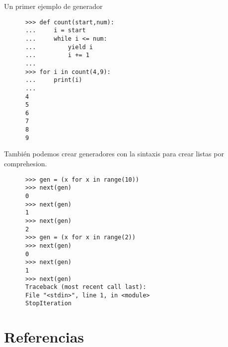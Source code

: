 \documentclass[spanish]{beamer}
\begin{document}
  \begin{frame}[fragile]
    Un primer ejemplo de generador
    \begin{lstlisting}
      >>> def count(start,num):
      ...     i = start
      ...     while i <= num:
      ...         yield i
      ...         i += 1
      ... 
      >>> for i in count(4,9):
      ...     print(i)
      ... 
      4
      5
      6
      7
      8
      9

    \end{lstlisting}
  \end{frame}


  \begin{frame}[fragile]
    También podemos crear generadores con la sintaxis para crear listas por comprehesion.
    \begin{lstlisting}
      >>> gen = (x for x in range(10))
      >>> next(gen)
      0
      >>> next(gen)
      1
      >>> next(gen)
      2
      >>> gen = (x for x in range(2))
      >>> next(gen)
      0
      >>> next(gen)
      1
      >>> next(gen)
      Traceback (most recent call last):
      File "<stdin>", line 1, in <module>
      StopIteration

    \end{lstlisting}
  \end{frame}
  \section{Referencias}

\end{document}
